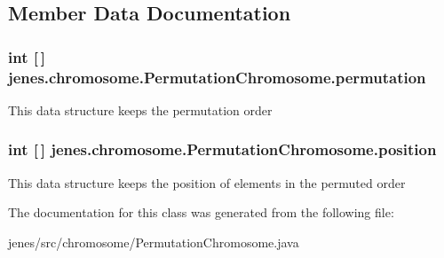 \subsection{Member Data Documentation}
\hypertarget{classjenes_1_1chromosome_1_1_permutation_chromosome_a8b5701fbbb3cdfef29d346e0375260fc}{
\subsubsection[{permutation}]{\setlength{\rightskip}{0pt plus 5cm}int \mbox{[}$\,$\mbox{]} jenes.\-chromosome.\-Permutation\-Chromosome.\-permutation\hspace{0.3cm}{\ttfamily [protected]}}}\label{classjenes_1_1chromosome_1_1_permutation_chromosome_a8b5701fbbb3cdfef29d346e0375260fc}
This data structure keeps the permutation order \hypertarget{classjenes_1_1chromosome_1_1_permutation_chromosome_aeb2d393eb8a9cc106205e13fb88446cc}{
\subsubsection[{position}]{\setlength{\rightskip}{0pt plus 5cm}int \mbox{[}$\,$\mbox{]} jenes.\-chromosome.\-Permutation\-Chromosome.\-position\hspace{0.3cm}{\ttfamily [protected]}}}\label{classjenes_1_1chromosome_1_1_permutation_chromosome_aeb2d393eb8a9cc106205e13fb88446cc}
This data structure keeps the position of elements in the permuted order 

The documentation for this class was generated from the following file\-:\begin{DoxyCompactItemize}
\item 
jenes/src/chromosome/Permutation\-Chromosome.\-java\end{DoxyCompactItemize}
